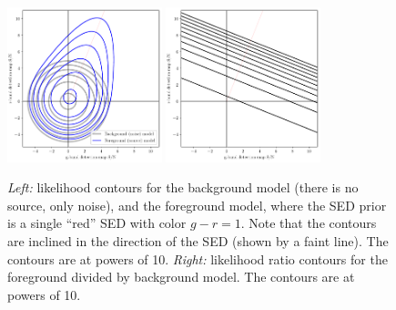 \documentclass[letterpaper,preprint]{aastex62}
\begin{document}
\begin{figure}
    \begin{center}
    \includegraphics[width=0.4\textwidth]{prob-contours-a}
    \includegraphics[width=0.4\textwidth]{prob-rel-a}
    \caption{ \emph{Left:} likelihood contours for the background
      model (there is no source, only noise), and the foreground
      model, where the SED prior is a single ``red'' SED with color $g
      - r = 1$.  Note that the contours are inclined in the direction
      of the SED (shown by a faint line).  The contours are at powers
      of 10.  \emph{Right:} likelihood ratio contours for the
      foreground divided by background model.  The contours are at
      powers of 10.
      \label{fig:cona}
    }
    \end{center}
\end{figure}
\end{document}
